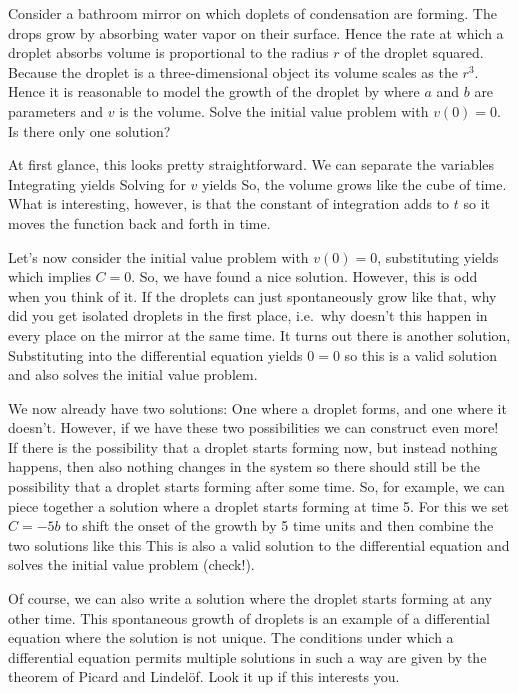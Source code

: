 \label{exGrowthCondensation}Consider a bathroom mirror on which doplets of condensation are forming. The drops grow by absorbing water vapor on their surface. Hence the rate at which a droplet absorbs volume is proportional to the radius $r$ of the droplet squared. Because the droplet is a three-dimensional object its volume scales as the $r^3$. Hence it is reasonable to model the growth of the droplet by    
where $a$ and $b$ are parameters and $v$ is the volume. Solve the initial value problem with $v(0)=0$. Is there only one solution?  

\solution 
At first glance, this looks pretty straightforward. We can separate the variables
Integrating yields
Solving for $v$ yields 
So, the volume grows like the cube of time. What is interesting, however, is that the constant of integration adds to $t$ so it moves the function back and forth in time. 

Let's now consider the initial value problem with $v(0)=0$, substituting yields 
which implies $C=0$. So, we have found a nice solution. 
However, this is odd when you think of it. If the droplets can just spontaneously grow like that, why did you get isolated droplets in the first place, i.e.~why doesn't this happen in every place on the mirror at the same time. It turns out there is another solution, 
Substituting into the differential equation yields $0=0$ so this is a valid solution and also solves the initial value problem. 

We now already have two solutions: One where a droplet forms, and one where it doesn't. However, if we have these two possibilities we can construct even more! If there is the possibility that a droplet starts forming now, but instead nothing happens, then also nothing changes in the system so there should still be the possibility that a droplet starts forming after some time.
So, for example, we can piece together a solution where a droplet starts forming at time 5. For this we set $C=-5b$ to shift the onset of the growth by 5 time units and then combine the two solutions like this 
This is also a valid solution to the differential equation and solves the initial value problem (check!). 

Of course, we can also write a solution where the droplet starts forming at any other time. This spontaneous growth of droplets is an example of a differential equation where the solution is not unique. The conditions under which a differential equation permits multiple solutions in such a way are given by the theorem of Picard and Lindel\"of. Look it up if this interests you.   
